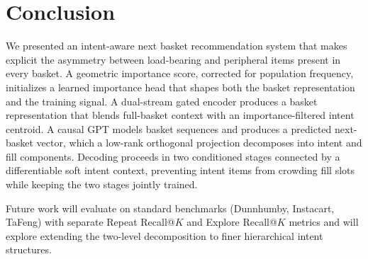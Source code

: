 \documentclass[conference]{IEEEtran}
\begin{document}
\section{Conclusion}
\label{sec:conclusion}

We presented an intent-aware next basket recommendation system that
makes explicit the asymmetry between load-bearing and peripheral items
present in every basket. A geometric importance score, corrected for
population frequency, initializes a learned importance head that shapes
both the basket representation and the training signal. A dual-stream
gated encoder produces a basket representation that blends full-basket
context with an importance-filtered intent centroid. A causal GPT models
basket sequences and produces a predicted next-basket vector, which a
low-rank orthogonal projection decomposes into intent and fill
components. Decoding proceeds in two conditioned stages connected by a
differentiable soft intent context, preventing intent items from crowding
fill slots while keeping the two stages jointly trained.

Future work will evaluate on standard benchmarks (Dunnhumby, Instacart,
TaFeng) with separate Repeat Recall@$K$ and Explore Recall@$K$ metrics
and will explore extending the two-level decomposition to finer
hierarchical intent structures.



\end{document}
